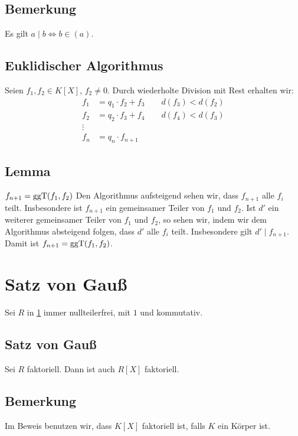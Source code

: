 \subsection[Bemerkung, die den Namen eigentlich nicht verdient hat]{Bemerkung} %
\label{sub:716}
Es gilt $a \mid b \iff b \in (a)$.

\subsection{Euklidischer Algorithmus} %
\label{sub:717}
Seien $f_1, f_2 \in K[X]$, $f_2 \not= 0$. Durch wiederholte Division mit Rest erhalten wir: 
\begin{align*}
	f_1 &= q_1 \cdot f_2 + f_3 \qquad d(f_3) < d(f_2) \\
	f_2 &= q_2 \cdot f_3 + f_4 \qquad d(f_4) < d(f_3) \\
	\vdots & \\
	f_n &= q_n \cdot f_{n+1}
\end{align*}

\subsection[Lemma: Der euklidische Algorithmus berechnet den $\ggT$]{Lemma} %
\label{sub:718}
$f_{n+1}= \operatorname{ggT}(f_1,f_2)$
Den Algorithmus aufsteigend sehen wir, dass $f_{n+1}$ alle $f_i$ teilt. Insbesondere ist $f_{n+1}$ ein gemeinsamer Teiler von $f_1$ und $f_2$. Ist $d'$ ein weiterer gemeinsamer
Teiler von $f_1$ und $f_2$, so sehen wir, indem wir dem Algorithmus absteigend folgen, dass $d'$ alle $f_i$ teilt. Insbesondere gilt $d' \mid f_{n+1}$. Damit ist $f_{n+1} = \operatorname{ggT}(f_1, f_2)$. \bewende
\newpage


\section{Satz von Gauß} %
\label{sec:8}
Sei $R$ in \ref{sec:8} immer nullteilerfrei, mit $1$ und kommutativ.

\subsection{Satz von Gauß} %
\label{sub:81}
Sei $R$ faktoriell. Dann ist auch $R[X]$ faktoriell.

\subsection[Bemerkung: Hinweis zu Beweistrategie]{Bemerkung} %
\label{sub:82}
Im Beweis benutzen wir, dass $K[X]$ faktoriell ist, falls $K$ ein Körper ist.

